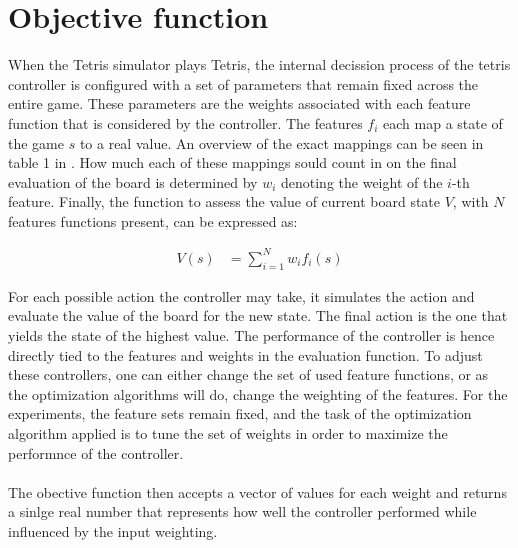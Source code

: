 \section{Objective function}

When the Tetris simulator plays Tetris, the internal decission process
of the tetris controller is configured with a set of parameters that remain
fixed across the entire game. These parameters are the weights associated 
with each feature function that is considered by the controller. The features $f_{i}$
each map a state of the game $s$ to a real value. An overview of the exact mappings
can be seen in table 1 in \citep{scherrer2009:b}. How much each of these mappings
sould count in on the final evaluation of the board is determined by $w_{i}$
denoting the weight of the $i$-th feature. Finally, the function to assess the value 
of current board state $V$, with $N$ features functions present, can be expressed as:

\begin{align*}
V(s) &= \sum_{i=1}^{N} w_{i}f_{i}(s)
\end{align*}

For each possible action the controller may take, it simulates 
the action and evaluate the value of the board for the new state. 
The final action is the one that yields the state of the highest value.
The performance of the controller is hence directly tied to the 
features and weights in the evaluation function. To adjust these controllers,
one can either change the set of used feature functions, or as the 
optimization algorithms will do, change the weighting of the features.
For the experiments, the feature sets remain fixed, and the task of the
optimization algorithm applied is to tune the set of weights in order 
to maximize the performnce of the controller.\\
\\
The obective function then accepts a vector of values for each weight
and returns a sinlge real number that represents how well the controller
performed while influenced by the input weighting.


